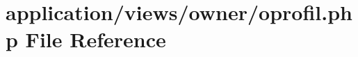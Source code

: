 \hypertarget{oprofil_8php}{}\section{application/views/owner/oprofil.php File Reference}
\label{oprofil_8php}
